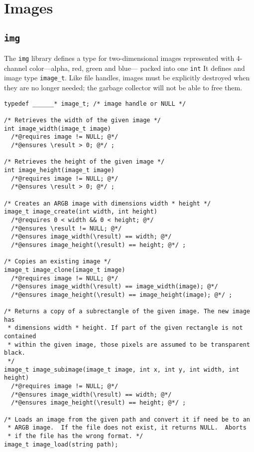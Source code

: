 \documentclass[11pt]{article}
\begin{document}
\section{Images}

\subsection{\tt img}

The \verb'img' library defines a type for two-dimensional images
represented with 4-channel color---alpha, red, green and blue---
packed into one \verb'int'  It defines and image type \verb'image_t'.
Like file handles, images must be explicitly destroyed when they
are no longer needed; the garbage collector will not be able to
free them.

\begin{small}
\begin{verbatim}
typedef ______* image_t; /* image handle or NULL */

/* Retrieves the width of the given image */
int image_width(image_t image)
  /*@requires image != NULL; @*/
  /*@ensures \result > 0; @*/ ;

/* Retrieves the height of the given image */
int image_height(image_t image)
  /*@requires image != NULL; @*/ 
  /*@ensures \result > 0; @*/ ; 

/* Creates an ARGB image with dimensions width * height */
image_t image_create(int width, int height)
  /*@requires 0 < width && 0 < height; @*/
  /*@ensures \result != NULL; @*/
  /*@ensures image_width(\result) == width; @*/
  /*@ensures image_height(\result) == height; @*/ ; 

/* Copies an existing image */
image_t image_clone(image_t image)
  /*@requires image != NULL; @*/
  /*@ensures image_width(\result) == image_width(image); @*/
  /*@ensures image_height(\result) == image_height(image); @*/ ;

/* Returns a copy of a subrectangle of the given image. The new image has
 * dimensions width * height. If part of the given rectangle is not contained
 * within the given image, those pixels are assumed to be transparent black.
 */
image_t image_subimage(image_t image, int x, int y, int width, int height)
  /*@requires image != NULL; @*/
  /*@ensures image_width(\result) == width; @*/
  /*@ensures image_height(\result) == height; @*/ ;

/* Loads an image from the given path and convert it if need be to an
 * ARGB image.  If the file does not exist, it returns NULL.  Aborts
 * if the file has the wrong format. */
image_t image_load(string path);


\end{verbatim}
\end{small}
\end{document}

